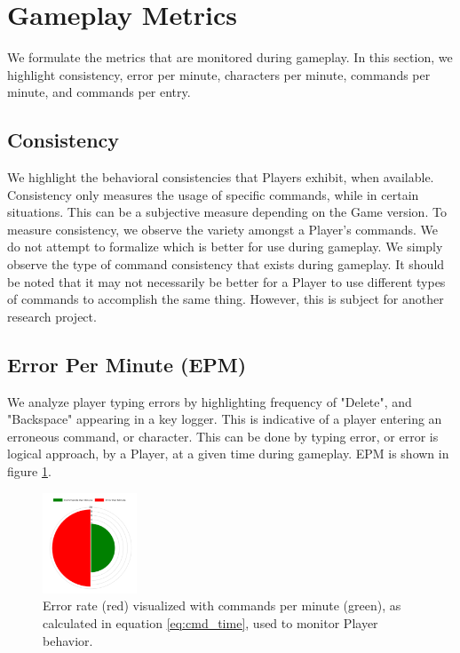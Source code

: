 \documentclass[10pt, titlepage, twocolumn]{article}
\newcommand{\ii}{\indent\indent}
\begin{document}




\section{Gameplay Metrics}
We formulate the metrics that are monitored during gameplay. In this section, we highlight consistency, error per minute, characters per minute, commands per minute, and commands per entry.

\subsection{Consistency}
\ii
We highlight the behavioral consistencies that Players exhibit, when available. Consistency only measures the usage of specific commands, while in certain situations. This can be a subjective measure depending on the Game version. To measure consistency, we observe the variety amongst a Player's commands. We do not attempt to formalize which is better for use during gameplay. We simply observe the type of command consistency that exists during gameplay. It should be noted that it may not necessarily be better for a Player to use different types of commands to accomplish the same thing. However, this is subject for another research project.


\subsection{Error Per Minute (EPM)}
\ii
We analyze player typing errors by highlighting frequency of "Delete", and "Backspace" appearing in a key logger. This is indicative of a player entering an erroneous command, or character. This can be done by typing error, or error is logical approach, by a Player, at a given time during gameplay. EPM is shown in figure \ref{commandpermin}.

\begin{figure}[ht]
	\centering
	\includegraphics[width=0.25\textwidth]{commandpermin}
	\caption{Error rate (red) visualized with commands per minute (green), as calculated in equation \ref{eq:cmd_time}, used to monitor Player behavior. }
	\label{commandpermin}
\end{figure}
\end{document}
